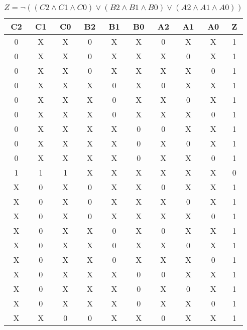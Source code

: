\begin{center}
    \begin{table}[h] \caption{\(Z = \lnot ((C2 \land C1 \land C0) \lor (B2 \land B1 \land B0) \lor (A2 \land A1 \land A0)) \)}
        \begin{center}
            \begin{tabular}{|c|c|c|c|c|c|c|c|c||c|} \hline
            C2 & C1 & C0 & B2 & B1 & B0 & A2 & A1 & A0 & Z \\ \hline\hline
            0  & X  & X  & 0  & X  & X  & 0  & X  & X  & 1 \\ \hline
            0  & X  & X  & 0  & X  & X  & X  & 0  & X  & 1 \\ \hline
            0  & X  & X  & 0  & X  & X  & X  & X  & 0  & 1 \\ \hline
            0  & X  & X  & X  & 0  & X  & 0  & X  & X  & 1 \\ \hline
            0  & X  & X  & X  & 0  & X  & X  & 0  & X  & 1 \\ \hline
            0  & X  & X  & X  & 0  & X  & X  & X  & 0  & 1 \\ \hline
            0  & X  & X  & X  & X  & 0  & 0  & X  & X  & 1 \\ \hline
            0  & X  & X  & X  & X  & 0  & X  & 0  & X  & 1 \\ \hline
            0  & X  & X  & X  & X  & 0  & X  & X  & 0  & 1 \\ \hline
            1  & 1  & 1  & X  & X  & X  & X  & X  & X  & 0 \\ \hline
            X  & 0  & X  & 0  & X  & X  & 0  & X  & X  & 1 \\ \hline
            X  & 0  & X  & 0  & X  & X  & X  & 0  & X  & 1 \\ \hline
            X  & 0  & X  & 0  & X  & X  & X  & X  & 0  & 1 \\ \hline
            X  & 0  & X  & X  & 0  & X  & 0  & X  & X  & 1 \\ \hline
            X  & 0  & X  & X  & 0  & X  & X  & 0  & X  & 1 \\ \hline
            X  & 0  & X  & X  & 0  & X  & X  & X  & 0  & 1 \\ \hline
            X  & 0  & X  & X  & X  & 0  & 0  & X  & X  & 1 \\ \hline
            X  & 0  & X  & X  & X  & 0  & X  & 0  & X  & 1 \\ \hline
            X  & 0  & X  & X  & X  & 0  & X  & X  & 0  & 1 \\ \hline
            X  & X  & 0  & 0  & X  & X  & 0  & X  & X  & 1 \\ \hline

\end{tabular}
\end{center}
\end{table}
\end{center}
